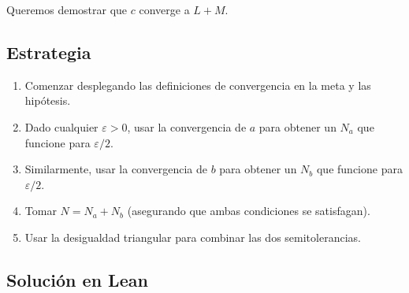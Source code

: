 Queremos demostrar que $c$ converge a $L+M$.

\subsection{Estrategia}

\begin{enumerate}
  \item Comenzar desplegando las definiciones de convergencia en la meta y
        las hipótesis.
  \item Dado cualquier $\varepsilon > 0$, usar la convergencia de $a$ para
        obtener un $N_a$ que funcione para $\varepsilon/2$.
  \item Similarmente, usar la convergencia de $b$ para obtener un $N_b$
        que funcione para $\varepsilon/2$.
  \item Tomar $N = N_a + N_b$ (asegurando que ambas condiciones se
        satisfagan).
  \item Usar la desigualdad triangular para combinar las dos
        semitolerancias.
\end{enumerate}

\subsection{Solución en Lean}

